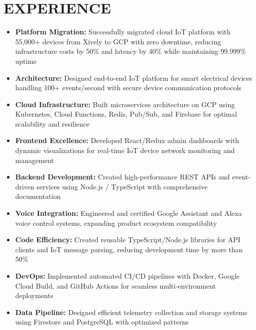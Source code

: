 \documentclass{fullstackdeveloper-ats}
\begin{document}
\section{EXPERIENCE}


\begin{itemize}
    \item \textbf{Platform Migration:} Successfully migrated cloud IoT platform with 55,000+ devices from Xively to GCP with zero downtime, reducing infrastructure costs by 50\% and latency by 40\% while maintaining 99.999\% uptime
    \item \textbf{Architecture:} Designed end-to-end IoT platform for smart electrical devices handling 100+ events/second with secure device communication protocols
    \item \textbf{Cloud Infrastructure:} Built microservices architecture on GCP using Kubernetes, Cloud Functions, Redis, Pub/Sub, and Firebase for optimal scalability and resilience
    \item \textbf{Frontend Excellence:} Developed React/Redux admin dashboards with dynamic visualizations for real-time IoT device network monitoring and management
    \item \textbf{Backend Development:} Created high-performance REST APIs and event-driven services using Node.js /  TypeScript with comprehensive documentation
    \item \textbf{Voice Integration:} Engineered and certified Google Assistant and Alexa voice control systems, expanding product ecosystem compatibility
    \item \textbf{Code Efficiency:} Created reusable TypeScript/Node.js libraries for API clients and IoT message parsing, reducing development time by more than 50\%
    \item \textbf{DevOps:} Implemented automated CI/CD pipelines with Docker, Google Cloud Build, and GitHub Actions for seamless multi-environment deployments
    \item \textbf{Data Pipeline:} Designed efficient telemetry collection and storage systems using Firestore and PostgreSQL with optimized patterns
\end{itemize}


\end{document}
